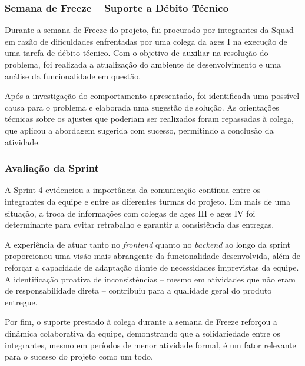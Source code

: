 \subsubsection*{Semana de Freeze -- Suporte a Débito Técnico}

Durante a semana de Freeze do projeto, fui procurado por integrantes da Squad em razão
de dificuldades enfrentadas por uma colega da \ac{ages} I na execução de uma tarefa de
débito técnico. Com o objetivo de auxiliar na resolução do problema, foi realizada a
atualização do ambiente de desenvolvimento e uma análise da funcionalidade em questão.

Após a investigação do comportamento apresentado, foi identificada uma possível causa
para o problema e elaborada uma sugestão de solução. As orientações técnicas sobre os
ajustes que poderiam ser realizados foram repassadas à colega, que aplicou a abordagem
sugerida com sucesso, permitindo a conclusão da atividade.

\subsubsection*{Avaliação da Sprint}

A Sprint 4 evidenciou a importância da comunicação contínua entre os integrantes da
equipe e entre as diferentes turmas do projeto. Em mais de uma situação, a troca de
informações com colegas de \ac{ages} III e \ac{ages} IV foi determinante para evitar
retrabalho e garantir a consistência das entregas.

A experiência de atuar tanto no \textit{frontend} quanto no \textit{backend} ao longo
da sprint proporcionou uma visão mais abrangente da funcionalidade desenvolvida, além
de reforçar a capacidade de adaptação diante de necessidades imprevistas da equipe. A
identificação proativa de inconsistências -- mesmo em atividades que não eram de
responsabilidade direta -- contribuiu para a qualidade geral do produto entregue.

Por fim, o suporte prestado à colega durante a semana de Freeze reforçou a dinâmica
colaborativa da equipe, demonstrando que a solidariedade entre os integrantes, mesmo
em períodos de menor atividade formal, é um fator relevante para o sucesso do projeto
como um todo.
